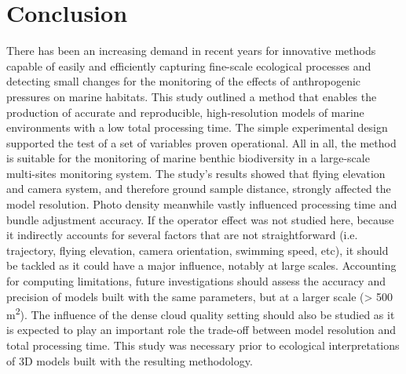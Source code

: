 \section[Conclusion]{Conclusion}\label{chapitre2_5}
There has been an increasing demand in recent years for innovative methods capable of easily and efficiently capturing fine-scale ecological processes and detecting small changes for the monitoring of the effects of anthropogenic pressures on marine habitats. This study outlined a method that enables the production of accurate and reproducible, high-resolution models of marine environments with a low total processing time. The simple experimental design supported the test of a set of variables proven operational. All in all, the method is suitable for the monitoring of marine benthic biodiversity in a large-scale multi-sites monitoring system. The study’s results showed that flying elevation and camera system, and therefore ground sample distance, strongly affected the model resolution. Photo density meanwhile vastly influenced processing time and bundle adjustment accuracy. If the operator effect was not studied here, because it indirectly accounts for several factors that are not straightforward (i.e. trajectory, flying elevation, camera orientation, swimming speed, etc), it should be tackled as it could have a major influence, notably at large scales. Accounting for computing limitations, future investigations should assess the accuracy and precision of models built with the same parameters, but at a larger scale (> 500 m\textsuperscript{2}). The influence of the dense cloud quality setting should also be studied as it is expected to play an important role the trade-off between model resolution and total processing time. This study was necessary prior to ecological interpretations of 3D models built with the resulting methodology. 
